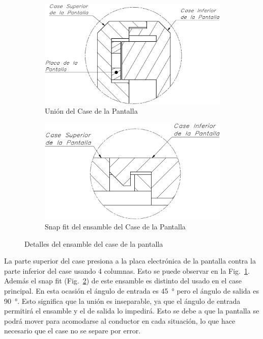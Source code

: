 \begin{figure}[hbt!]
\centering
\begin{subfigure}{.5\textwidth}
  \centering
  \includegraphics[width=0.9\linewidth]{union_pantalla.pdf}
  \caption{Unión del Case de la Pantalla}
  \label{fig:union_pantalla}
\end{subfigure}%
\begin{subfigure}{.5\textwidth}
  \centering
  \includegraphics[width=0.9\linewidth]{snap_pantalla.pdf}
  \caption{Snap fit del ensamble del Case de la Pantalla}
  \label{fig:snap_pantalla}
\end{subfigure}
\caption{Detalles del ensamble del case de la pantalla}
\label{fig:test}
\end{figure}


La parte superior del case presiona a la placa electrónica  de la pantalla contra la parte inferior del case usando 4 columnas. Esto se puede observar en la Fig.~\ref{fig:union_pantalla}. Además el snap fit (Fig.~\ref{fig:snap_pantalla}) de este ensamble es distinto del usado en el case principal. En esta ocasión el ángulo de entrada es \SI{45}{\degree} pero el ángulo de salida es \SI{90}{\degree}. Esto significa que la unión es inseparable, ya que el ángulo de entrada permitirá el ensamble y el de salida lo impedirá. Esto se debe a que la pantalla se podrá mover para acomodarse al conductor en cada situación, lo que hace necesario que el case no se separe por error.


